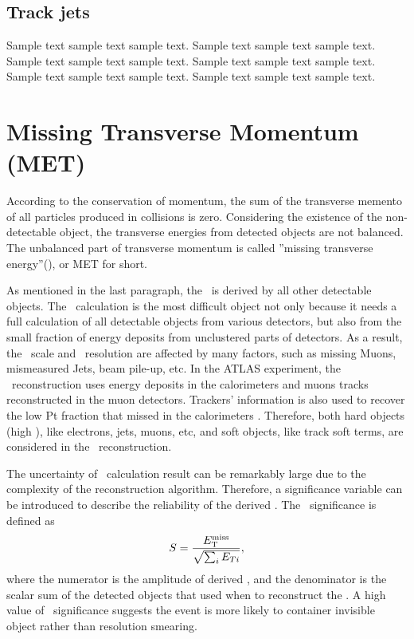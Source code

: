 \subsection{Track jets}
\label{sec:track}
Sample text sample text sample text. Sample text sample text sample text.
Sample text sample text sample text. Sample text sample text sample text.
Sample text sample text sample text. Sample text sample text sample text.


\section{Missing Transverse Momentum (MET)}

\label{sec:met}
\par According to the conservation of momentum, the sum of the transverse memento of all particles produced in collisions is zero. Considering the existence of the non-detectable object, the transverse energies from detected objects are not balanced. The unbalanced part of transverse momentum is called ''missing transverse energy''(\met), or MET for short.

\par As mentioned in the last paragraph, the \met~is derived by all other detectable objects. The \met~calculation is the most difficult object not only because it needs a full calculation of all detectable objects from various detectors, but also from the small fraction of energy deposits from unclustered parts of detectors. As a result, the \met~scale and \met~resolution are affected by many factors, such as missing Muons, mismeasured Jets, beam pile-up, etc. In the ATLAS experiment, the \met~reconstruction uses energy deposits in the calorimeters and muons tracks reconstructed in the muon detectors. Trackers' information is also used to recover the low Pt fraction that missed in the calorimeters \cite{ATLAS-CONF-2013-082}. Therefore, both hard objects (high \pt), like electrons, jets, muons, etc, and soft objects, like track soft terms, are considered in the \met~reconstruction.

\par The uncertainty of \met~calculation result can be remarkably large due to the complexity of the reconstruction algorithm. Therefore, a significance variable can be introduced to describe the reliability of the derived \met. The \met~significance is defined as
$$ S=\frac{E_{\mathrm{T}}^{\mathrm{miss}}}{\sqrt{\sum_{i}E_{Ti}}}, $$
where the numerator is the amplitude of derived \met, and the denominator is the scalar sum of the detected objects that used when to reconstruct the \met. A high value of \met~significance suggests the event is more likely to container invisible object rather than resolution smearing.
